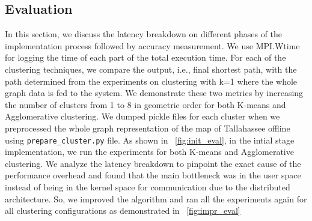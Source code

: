 \subsection{Evaluation}
\label{sec:eval}
In this section, we discuss the latency breakdown on different phases of the implementation process
followed by accuracy measurement. We use MPI.Wtime for logging the time of each part of the total execution
time. For each of the clustering techniques, we compare the output, i.e., final shortest path, with the path
determined from the experiments on clustering with k=1 where the whole graph data is fed to the system.
We demonstrate these two metrics by increasing the number of clusters from 1 to 8 in geometric order for
both K-means and Agglomerative clustering. We dumped pickle files for each cluster when we preprocessed the
whole graph representation of the map of Tallahassee offline using \texttt{prepare\_cluster.py} file.
As shown in \figurename~\ref{fig:init_eval}, in the intial stage implementation, we run the experiments
for both K-means and Agglomerative clustering. We analyze the latency breakdown to pinpoint the exact
cause of the performance overhead and found that the main bottleneck was in the user space instead of
being in the kernel space for communication due to the distributed architecture. So, we improved the
algorithm and ran all the experiments again for all clustering configurations as demonstrated in
\figurename~\ref{fig:impr_eval}

